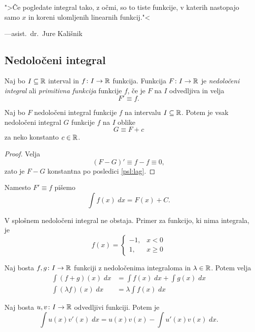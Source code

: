 \documentclass[12pt, a4paper]{article}
\begin{document}
\epigraph{">Če pogledate integral tako, z očmi, so to tiste funkcije, v katerih nastopajo samo $x$ in koreni ulomljenih linearnih funkcij."<}{---asist.~dr.~Jure Kališnik}

\subsection{Nedoločeni integral}

\begin{okvir}
\begin{definicija}
Naj bo $I\subseteq\mathbb{R}$ interval in $f\colon I\to\mathbb{R}$ funkcija. Funkcija $F\colon I\to\mathbb{R}$ je \emph{nedoločeni integral} ali \emph{primitivna funkcija} funkcije $f$, če je $F$ na $I$ odvedljiva in velja
\[
F'\equiv f.
\]
\end{definicija}
\end{okvir}

\begin{trditev}
Naj bo $F$ nedoločeni integral funkcije $f$ na intervalu $I\subseteq\mathbb{R}$. Potem je vsak nedoločeni integral $G$ funkcije $f$ na $I$ oblike
\[
G\equiv F+c
\]
za neko konstanto $c\in\mathbb{R}$.
\end{trditev}

\begin{proof}
Velja
\[
(F-G)'\equiv f-f\equiv 0,
\]
zato je $F-G$ konstantna po posledici \ref{psl:lag}.
\end{proof}

Namesto $F'\equiv f$ pišemo
\[
\int f(x)\;dx=F(x)+C.
\]

\begin{opomba}
V splošnem nedoločeni integral ne obstaja. Primer za funkcijo, ki nima integrala, je
\[
f(x)=\begin{cases}
-1, & x < 0
\\
1,  & x \geq 0
\end{cases}
\]
\end{opomba}

\begin{trditev}
Naj bosta $f,g\colon I\to\mathbb{R}$ funkciji z nedoločenima integraloma in $\lambda\in\mathbb{R}$. Potem velja
\begin{align*}
\int(f+g)(x)\;dx &= \int f(x)\;dx+\int g(x)\;dx
\\
\int (\lambda f)(x)\;dx &= \lambda\int f(x)\;dx
\end{align*}
\end{trditev}

\obvs

\begin{trditev}
Naj bosta $u, v\colon I\to\mathbb{R}$ odvedljivi funkciji. Potem je
\[
\int u(x) v'(x)\;dx = u(x) v(x) - \int u'(x) v(x)\;dx.
\]
\end{trditev}
\end{document}
